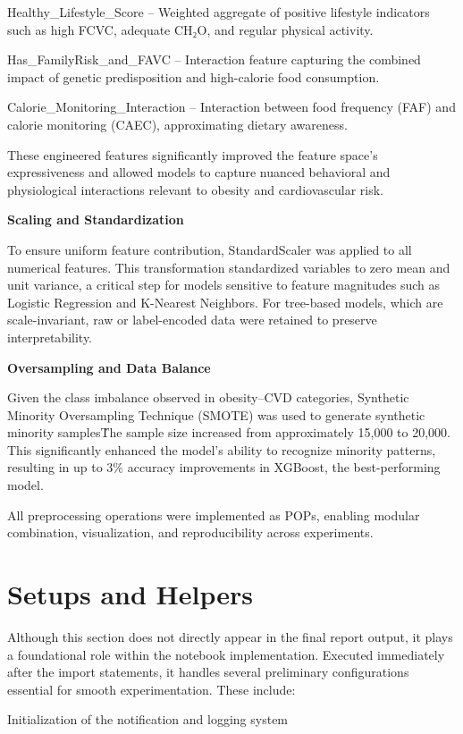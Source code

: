 Healthy\_Lifestyle\_Score – Weighted aggregate of positive lifestyle indicators such as high FCVC, adequate CH₂O, and regular physical activity.

Has\_FamilyRisk\_and\_FAVC – Interaction feature capturing the combined impact of genetic predisposition and high-calorie food consumption.

Calorie\_Monitoring\_Interaction – Interaction between food frequency (FAF) and calorie monitoring (CAEC), approximating dietary awareness.

These engineered features significantly improved the feature space’s expressiveness and allowed models to capture nuanced behavioral and physiological interactions relevant to obesity and cardiovascular risk.

\textbf{Scaling and Standardization}

To ensure uniform feature contribution, StandardScaler was applied to all numerical features.
This transformation standardized variables to zero mean and unit variance, a critical step for models sensitive to feature magnitudes such as Logistic Regression and K-Nearest Neighbors.
For tree-based models, which are scale-invariant, raw or label-encoded data were retained to preserve interpretability.

\textbf{Oversampling and Data Balance}

Given the class imbalance observed in obesity–CVD categories, Synthetic Minority Oversampling Technique (SMOTE) was used to generate synthetic minority samples\. The sample size increased from approximately 15,000 to 20,000.
This significantly enhanced the model’s ability to recognize minority patterns, resulting in up to 3\% accuracy improvements in XGBoost, the best-performing model.

All preprocessing operations were implemented as POPs, enabling modular combination, visualization, and reproducibility across experiments.


\section{Setups and Helpers}\label{sec:setups-and-helpers}
Although this section does not directly appear in the final report output, it plays a foundational role within the notebook implementation.
Executed immediately after the import statements, it handles several preliminary configurations essential for smooth experimentation.
These include:

Initialization of the notification and logging system

